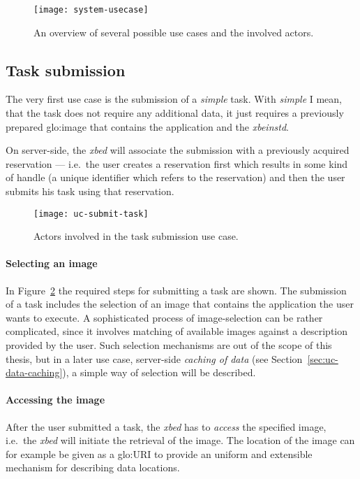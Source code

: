 \begin{figure}[htbp]
  \centering
  \texttt{[image: system-usecase]}
  \caption[Use case  overview]{An overview  of several possible  use cases
    and the involved actors.}
  \label{fig:system-usecases}
\end{figure}


\subsection{Task submission}
\label{sec:uc-task-submission}

The very  first use case is  the submission of a  \emph{simple} task. With
\emph{simple} I mean, that the  task does not require any additional data,
it just  requires a previously prepared \gls{glo:image}  that contains the
application and the \emph{xbeinstd}.

On  server-side, the  \emph{xbed}  will associate  the  submission with  a
previously acquired  reservation ---  i.e.~the user creates  a reservation
first  which results in  some kind  of handle  (a unique  identifier which
refers to the  reservation) and then the user submits  his task using that
reservation.

\begin{figure}[htbp]
  \centering
  \texttt{[image: uc-submit-task]}
  \caption[UC Task submission]{Actors involved  in the task submission use
    case.}
  \label{fig:uc-submit-task}
\end{figure}

\paragraph{Selecting an image}
In  Figure~\ref{fig:uc-submit-task} the  required steps  for  submitting a
task are  shown. The  submission of  a task includes  the selection  of an
image  that  contains  the  application  the user  wants  to  execute.   A
sophisticated process of image-selection  can be rather complicated, since
it involves matching of available images against a description provided by
the user. Such  selection mechanisms are out of the  scope of this thesis,
but  in  a  later  use  case,  server-side  \emph{caching  of  data}  (see
Section~\ref{sec:uc-data-caching}),  a  simple way  of  selection will  be
described.

\paragraph{Accessing the image}
After the user submitted a  task, the \emph{xbed} has to \emph{access} the
specified image,  i.e.~the \emph{xbed} will initiate the  retrieval of the
image.   The  location  of  the  image  can for  example  be  given  as  a
\gls{glo:URI}  to   provide  an  uniform  and   extensible  mechanism  for
describing data locations.

